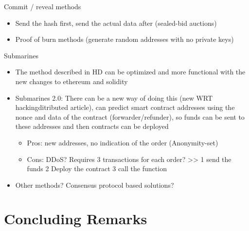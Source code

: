 Commit / reveal methods %
\begin{itemize}
\item{Send the hash first, send the actual data after (sealed-bid auctions)}
\item{Proof of burn methods (generate random addresses with no private keys)}
\end{itemize}
Submarines
\begin{itemize}
\item{The method described in HD can be optimized and more functional with the new changes to ethereum and solidity}
\item{Submarines 2.0: There can be a new way of doing this (new WRT hackingditributed article), can predict smart contract addresses using the nonce and data of the contract (forwarder/refunder), so funds can be sent to these addresses and then contracts can be deployed}
\begin {itemize}
\item{Pros: new addresses, no indication of the order (Anonymity-set)}
\item{Cons: DDoS? Requires 3 transactions for each order?} >> 1 send the funds 2 Deploy the contract 3 call the function
\end{itemize}
\item{Other methods? Consensus protocol based solutions?}

\end{itemize}









\section{Concluding Remarks}





